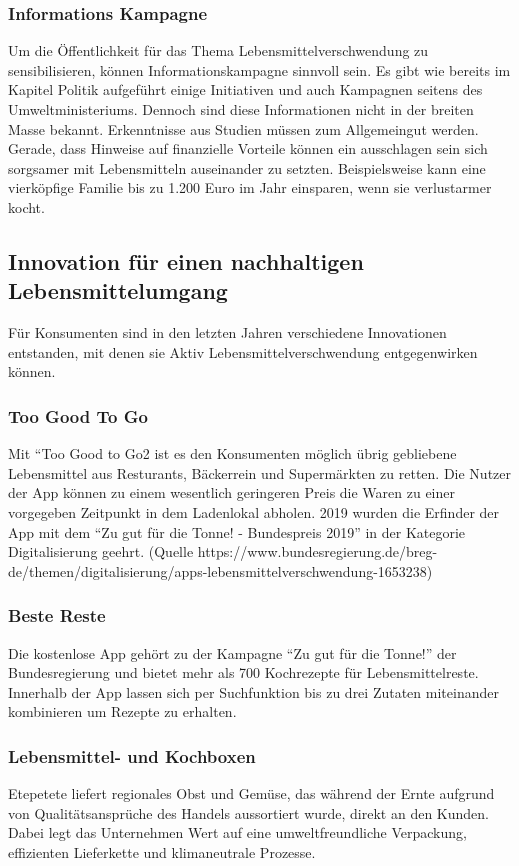 \subsubsection{Informations Kampagne}
Um die Öffentlichkeit für das Thema Lebensmittelverschwendung zu sensibilisieren, können Informationskampagne sinnvoll sein. Es gibt wie bereits im Kapitel Politik aufgeführt einige Initiativen und auch Kampagnen seitens des Umweltministeriums. Dennoch sind diese Informationen nicht in der breiten Masse bekannt. Erkenntnisse aus Studien müssen zum Allgemeingut werden. Gerade, dass Hinweise auf finanzielle Vorteile können ein ausschlagen sein sich sorgsamer mit Lebensmitteln auseinander zu setzten. Beispielsweise kann eine vierköpfige Familie bis zu 1.200 Euro im Jahr einsparen, wenn sie verlustarmer kocht. %


\subsection{Innovation für einen nachhaltigen Lebensmittelumgang}
Für Konsumenten sind in den letzten Jahren  verschiedene Innovationen entstanden, mit denen sie Aktiv Lebensmittelverschwendung entgegenwirken können. 

\subsubsection{Too Good To Go}
Mit “Too Good to Go2 ist es den Konsumenten möglich übrig gebliebene Lebensmittel aus Resturants, Bäckerrein und Supermärkten zu retten. Die Nutzer der App können zu einem wesentlich geringeren Preis die Waren zu einer vorgegeben Zeitpunkt in dem Ladenlokal abholen. 2019 wurden die Erfinder der App mit dem “Zu gut für die Tonne! - Bundespreis 2019” in der Kategorie Digitalisierung geehrt. (Quelle https://www.bundesregierung.de/breg-de/themen/digitalisierung/apps-lebensmittelverschwendung-1653238) 
\subsubsection{Beste Reste}
Die kostenlose App gehört zu der Kampagne “Zu gut für die Tonne!” der Bundesregierung und bietet mehr als 700 Kochrezepte für Lebensmittelreste. Innerhalb der App lassen sich per Suchfunktion bis zu drei Zutaten miteinander kombinieren um Rezepte zu erhalten.
\subsubsection{Lebensmittel- und Kochboxen}
Etepetete liefert regionales Obst und Gemüse, das während der Ernte aufgrund von Qualitätsansprüche des Handels aussortiert wurde, direkt an den Kunden. Dabei legt das Unternehmen Wert auf eine umweltfreundliche Verpackung, effizienten Lieferkette und klimaneutrale Prozesse.

